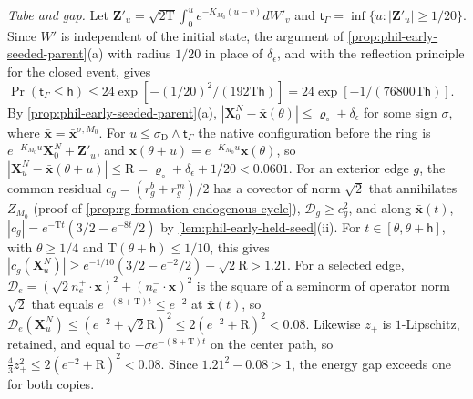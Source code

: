\emph{Tube and gap.} Let
\(\mathbf Z'_u=\sqrt{2\mathrm T}\int_0^ue^{-K_{M_0}(u-v)}dW'_v\) and
\(\mathsf t_\Gamma=\inf\{u:|\mathbf Z'_u|\ge1/20\}\). Since \(W'\) is independent
of the initial state, the argument of \cref{prop:phil-early-seeded-parent}(a)
with radius \(1/20\) in place of \(\delta_\epsilon\), and with the reflection
principle for the closed event, gives
\(\Pr(\mathsf t_\Gamma\le\mathsf h)\le24\exp[-(1/20)^2/(192\mathrm T\mathsf h)]
=24\exp[-1/(76800\mathrm T\mathsf h)]\). By
\cref{prop:phil-early-seeded-parent}(a),
\(|\mathbf X^N_0-\bar{\mathbf x}(\theta)|\le\varrho_\circ+\delta_\epsilon\)
for some sign \(\sigma\), where
\(\bar{\mathbf x}=\bar{\mathbf x}^{\sigma,M_0}\). For
\(u\le\sigma_{\mathrm D}\wedge\mathsf t_\Gamma\) the native configuration before the
ring is \(e^{-K_{M_0}u}\mathbf X^N_0+\mathbf Z'_u\), and
\(\bar{\mathbf x}(\theta+u)=e^{-K_{M_0}u}\bar{\mathbf x}(\theta)\), so
\(|\mathbf X^N_u-\bar{\mathbf x}(\theta+u)|\le\mathrm R=
\varrho_\circ+\delta_\epsilon+1/20<0.0601\). For an exterior edge \(g\), the
common residual \(c_g=(r^b_g+r^m_g)/2\) has a covector of norm \(\sqrt2\) that
annihilates \(Z_{M_0}\) (proof of \cref{prop:rg-formation-endogenous-cycle}),
\(\mathcal D_g\ge c_g^2\), and along \(\bar{\mathbf x}(t)\),
\(|c_g|=e^{-\mathrm Tt}(3/2-e^{-8t}/2)\) by
\cref{lem:phil-early-held-seed}(ii). For \(t\in[\theta,\theta+\mathsf h]\),
with \(\theta\ge1/4\) and \(\mathrm T(\theta+\mathsf h)\le1/10\), this gives
\(|c_g(\mathbf X^N_u)|\ge e^{-1/10}(3/2-e^{-2}/2)-\sqrt2\mathrm R>1.21\). For a
selected edge, \(\mathcal D_e=(\sqrt2n^+_e\cdot\mathbf x)^2+(n^-_e\cdot\mathbf x)^2\)
is the square of a seminorm of operator norm \(\sqrt2\) that equals
\(e^{-(8+\mathrm T)t}\le e^{-2}\) at \(\bar{\mathbf x}(t)\), so
\(\mathcal D_e(\mathbf X^N_u)\le(e^{-2}+\sqrt2\mathrm R)^2\le2(e^{-2}+\mathrm R)^2<0.08\).
Likewise \(z_+\) is \(1\)-Lipschitz, retained, and equal to
\(-\sigma e^{-(8+\mathrm T)t}\) on the center path, so
\(\frac43z_+^2\le2(e^{-2}+\mathrm R)^2<0.08\). Since \(1.21^2-0.08>1\),
the energy gap exceeds one for both copies.

